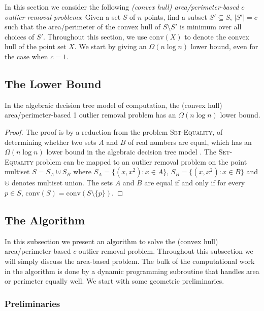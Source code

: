 \documentclass{elsart}
\newcommand{\ch}{\mathrm{conv}}
\begin{document}
In this section we consider the following \emph{(convex hull)
area/perimeter-based $c$ outlier removal problems}:  Given a set $S$
of $n$ points, find a subset $S'\subseteq S$, $|S'|=c$ such that the
area/perimeter of the convex hull of $S\setminus S'$ is minimum over
all choices of $S'$.  Throughout this section, we use $\ch(X)$ to
denote the convex hull of the point set $X$. We start by giving an
$\Omega(n\log n)$ lower bound, even for the case when $c=1$.


\subsection{The Lower Bound}


\begin{thm}
In the algebraic decision tree model of computation, the (convex hull)
area/perimeter-based 1 outlier removal problem has an 
$\Omega(n\log n)$ lower bound.
\end{thm}

\begin{proof}
The proof is by a reduction from the problem \textsc{Set-Equality}, of
determining whether two sets $A$ and $B$ of real numbers are equal,
which has an $\Omega(n\log n)$ lower bound in the algebraic decision
tree model \cite{b-o83}.  The \textsc{Set-Equality} problem can be
mapped to an outlier removal problem on the point multiset $S=S_A
\uplus S_B$ where $S_A=\{(x,x^2): x\in A\}$, $S_B=\{(x,x^2):x\in B\}$
and $\uplus$ denotes multiset union. The sets $A$ and $B$ are equal if
and only if for every $p\in S$, $\ch(S)=\ch(S\setminus\{p\})$. 
\end{proof}

\subsection{The Algorithm}

In this subsection we present an algorithm to solve the (convex hull)
area/perimeter-based $c$ outlier removal problem.  Throughout this
subsection we will simply discuss the area-based problem.  The bulk of
the computational work in the algorithm is done by a dynamic
programming subroutine that handles area or perimeter equally well.
We start with some geometric preliminaries.

\subsubsection{Preliminaries} 
\end{document}
